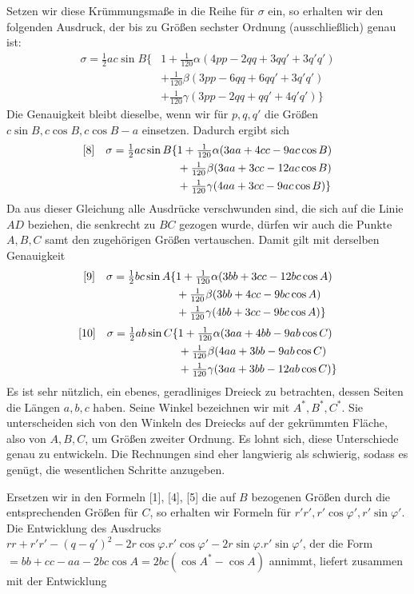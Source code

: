 %
Setzen wir diese Krümmungsmaße in die Reihe für \(\sigma\) ein, so erhalten wir den folgenden Ausdruck, der bis zu Größen sechster Ordnung (ausschließlich) genau ist:
\[
\begin{aligned}
\sigma=\tfrac{1}{2}ac\sin B\{&1+\tfrac{1}{120}\alpha(4pp-2qq+3qq'+3q'q')\\
&+\tfrac{1}{120}\beta(3pp-6qq+6qq'+3q'q')\\
&+\tfrac{1}{120}\gamma(3pp-2qq+qq'+4q'q')\}
\end{aligned}
\]
Die Genauigkeit bleibt dieselbe, wenn wir für \(p,q,q'\) die Größen \(c\sin B,c\cos B,c\cos B-a\) einsetzen. Dadurch ergibt sich
\[
\begin{aligned}
\relax[8]\quad\sigma=\tfrac{1}{2}ac\sin B\{&1+\tfrac{1}{120}\alpha(3aa+4cc-9ac\cos B)\\
&+\tfrac{1}{120}\beta(3aa+3cc-12ac\cos B)\\
&+\tfrac{1}{120}\gamma(4aa+3cc-9ac\cos B)\}
\end{aligned}
\]
Da aus dieser Gleichung alle Ausdrücke verschwunden sind, die sich auf die Linie \(AD\) beziehen, die senkrecht zu \(BC\) gezogen wurde, dürfen wir auch die Punkte \(A,B,C\) samt den zugehörigen Größen vertauschen. Damit gilt mit derselben Genauigkeit
\[
\begin{aligned}
\relax[9]\quad\sigma=\tfrac{1}{2}bc\sin A\{&1+\tfrac{1}{120}\alpha(3bb+3cc-12bc\cos A)\\
&+\tfrac{1}{120}\beta(3bb+4cc-9bc\cos A)\\
&+\tfrac{1}{120}\gamma(4bb+3cc-9bc\cos A)\}
\end{aligned}
\]
\[
\begin{aligned}
\relax[10]\quad\sigma=\tfrac{1}{2}ab\sin C\{&1+\tfrac{1}{120}\alpha(3aa+4bb-9ab\cos C)\\
&+\tfrac{1}{120}\beta(4aa+3bb-9ab\cos C)\\
&+\tfrac{1}{120}\gamma(3aa+3bb-12ab\cos C)\}
\end{aligned}
\]
Es ist sehr nützlich, ein ebenes, geradliniges Dreieck zu betrachten, dessen Seiten die Längen \(a,b,c\) haben. Seine Winkel bezeichnen wir mit \(A^*,B^*,C^*\). Sie unterscheiden sich von den Winkeln des Dreiecks auf der gekrümmten Fläche, also von \(A,B,C\), um Größen zweiter Ordnung. Es lohnt sich, diese Unterschiede genau zu entwickeln. Die Rechnungen sind eher langwierig als schwierig, sodass es genügt, die wesentlichen Schritte anzugeben.

Ersetzen wir in den Formeln [1], [4], [5] die auf \(B\) bezogenen Größen durch die entsprechenden Größen für \(C\), so erhalten wir Formeln für \(r'r',r'\cos\varphi',r'\sin\varphi'\). Die Entwicklung des Ausdrucks \(rr+r'r'-(q-q')^2-2r\cos\varphi\mathord{.}r'\cos\varphi'-2r\sin\varphi\mathord{.}r'\sin\varphi'\), der die Form \(=bb+cc-aa-2bc\cos A=2bc(\cos A^*-\cos A)\) annimmt, liefert zusammen mit der Entwicklung
